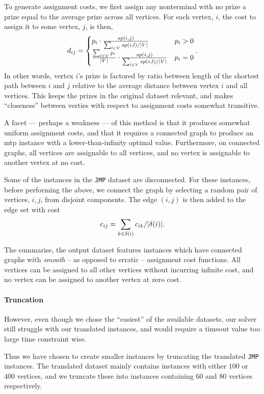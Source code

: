  To generate assignment costs, we first assign any nonterminal with no prize a prize
 equal to the average prize across all vertices. For each vertex, $i$, the cost to assign
 it to some vertex, $j$, is then,
 $$d_{ij} =
 \begin{cases}
   p_i \cdot \frac{sp(i, j)}{\sum_{l \in V}sp(i,l) / |V|} & p_i > 0 \\
      \frac{\sum_{l \in V} p_l}{|V|} \cdot \frac{sp(i, j)}{\sum_{l \in V}sp(i,l) / |V|} & p_i = 0
 \end{cases}\mathnormal{.}
$$
 In other words, vertex $i$'s prize is factored by ratio between length of the shortest path
 between $i$ and $j$ relative to the average distance between vertex $i$ and all vertices.
 This keeps the prizes in the original dataset relevant, and makes ``closeness'' between
 verties with respect to assignment costs somewhat transitive.

 A facet --- perhaps a weakness --- of this method is that it produces somewhat uniform
 assignment costs, and that it requires a connected graph to produce an \gls{mtp} instance
 with a lower-than-infinity optimal value. Furthermore, on connected graphs, all vertices
 are assignable to all vertices, and no vertex is assignable to another vertex at no cost.

 Some of the instances in the \texttt{JMP} dataset are disconnected. For these instances,
 before performing the above, we connect the graph by selecting a random pair of vertices,
 $i,j$, from disjoint components. The edge $(i,j)$ is then added to the edge set with cost
 \[c_{ij} = \sum_{k \in \delta(i)} c_{ik} / |\delta(i)|\mathnormal{.}\]

 The summarise, the output dataset features instances which have connected graphs with
 \textit{smooth} -- as opposed to erratic -- assignment cost functions. All vertices
 can be assigned to all other vertices without incurring infinite cost, and no vertex
 can be assigned to another vertex at zero cost. 

 \paragraph{Truncation} However, even though we chose the ``easiest'' of the available datasets,
 our solver still struggle with our translated instances, and would require a timeout
 value too large time constraint wise.

 Thus we have chosen to create smaller instances by truncating the translated \texttt{JMP}
 instances. The translated dataset mainly contains instances with either $100$ or $400$ vertices,
 and we truncate these into instances containing $60$ and $80$ vertices respectively.


